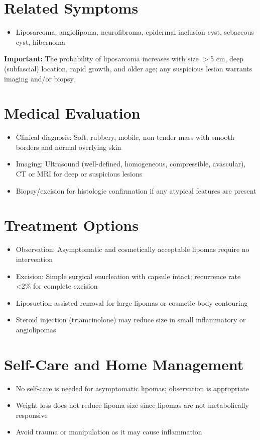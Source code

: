 \section*{Related Symptoms}
\begin{itemize}
  \item Liposarcoma, angiolipoma, neurofibroma, epidermal inclusion cyst, sebaceous cyst, hibernoma
\end{itemize}
\textbf{Important:} The probability of liposarcoma increases with size \ensuremath{>}5 cm, deep (subfascial) location, rapid growth, and older age; any suspicious lesion warrants imaging and/or biopsy.

\section*{Medical Evaluation}
\begin{itemize}
  \item Clinical diagnosis: Soft, rubbery, mobile, non-tender mass with smooth borders and normal overlying skin
  \item Imaging: Ultrasound (well-defined, homogeneous, compressible, avascular), CT or MRI for deep or suspicious lesions
  \item Biopsy/excision for histologic confirmation if any atypical features are present
\end{itemize}

\section*{Treatment Options}
\begin{itemize}
  \item Observation: Asymptomatic and cosmetically acceptable lipomas require no intervention
  \item Excision: Simple surgical enucleation with capsule intact; recurrence rate <2\% for complete excision
  \item Liposuction-assisted removal for large lipomas or cosmetic body contouring
  \item Steroid injection (triamcinolone) may reduce size in small inflammatory or angiolipomas
\end{itemize}

\section*{Self-Care and Home Management}
\begin{itemize}
  \item No self-care is needed for asymptomatic lipomas; observation is appropriate
  \item Weight loss does not reduce lipoma size since lipomas are not metabolically responsive
  \item Avoid trauma or manipulation as it may cause inflammation
\end{itemize}

